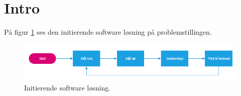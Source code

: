 \section{Intro}
På figur \ref{initierende_figur} ses den initierende software løsning på problemstillingen.
\begin{figure}[h!]
  \centering
  \includegraphics[width=1\textwidth]{figures/Fase1software.png}
  \caption{Initierende software løsning.}
  \label{initierende_figur}
\end{figure}
